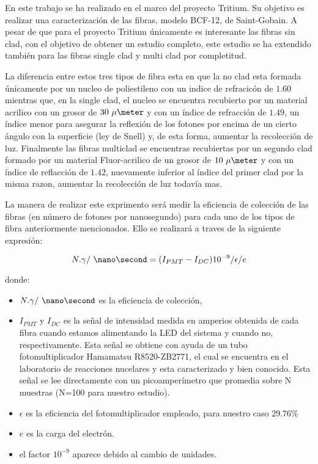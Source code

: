 En este trabajo se ha realizado en el marco del proyecto Tritium. Su objetivo es realizar una caracterización de las fibras, modelo BCF-12, de Saint-Gobain. A pesar de que para el proyecto Tritium únicamente es interesante las fibras sin clad, con el objetivo de obtener un estudio completo, este estudio se ha extendido también para las fibras single clad y multi clad por completitud.

La diferencia entre estos tres tipos de fibra esta en que la no clad esta formada únicamente por un nucleo de poliestileno con un indice de refracicón de $1.60$ mientras que, en la single clad, el nucleo se encuentra recubierto por un material acrilico con un grosor de $30~\mu\meter$ y con un índice de refracción de $1.49$, un índice menor para asegurar la reflexión de los fotones por encima de un cierto ángulo con la superficie (ley de Snell) y, de esta forma, aumentar la recolección de luz. Finalmente las fibras multiclad se encuentras recubiertas por un segundo clad formado por un material Fluor-acrilico de un grosor de $10~\mu\meter$ y con un índice de reflacción de $1.42$, nuevamente inferior al índice del primer clad por la misma razon, aumentar la recolección de luz todavía mas.

La manera de realizar este exprimento será medir la eficiencia de colección de las fibras (en número de fotones por nanosegundo) para cada uno de los tipos de fibra anteriormente mencionados. Ello se realizará a traves de la siguiente expresión:

\begin{equation}
N.\gamma/~\nano\second=(I_{PMT}-I_{DC})10^{-9}/\epsilon/e
\label{intensidad}
\end{equation}


donde:
\begin{itemize}
\item{} $N.\gamma/~\nano\second$ es la eficiencia de colección, 
\item{} $I_{PMT}$ y $I_{DC}$ es la señal de intensidad medida en amperios obtenida de cada fibra cuando estamos alimentando la LED del sistema y cuando no, respectivamente. Esta señal se obtiene con ayuda de un tubo fotomultiplicador Hamamatsu R8520-ZB2771, el cual se encuentra en el laboratorio de reacciones nucelares y esta caracterizado y bien conocido. Esta señal se lee directamente con un picoamperímetro que promedia sobre N muestras (N=100 para nuestro estudio).
\item{} $\epsilon$ es la eficiencia del fotomultiplicador empleado, para nuestro caso $29.76\%$
\item{} $e$ es la carga del electrón.
\item{} el factor $10^{-9}$ aparece debido al cambio de unidades.
\end{itemize}

